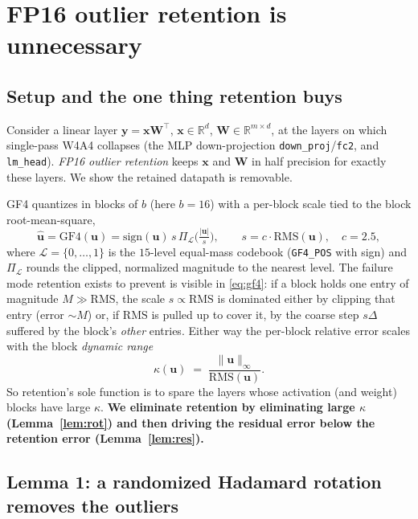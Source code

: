 \documentclass[11pt]{article}
\theoremstyle{remark}
\newcommand{\R}{\mathbb{R}}
\newcommand{\norm}[1]{\lVert #1 \rVert}
\newcommand{\rms}{\mathrm{RMS}}
\newcommand{\gf}{\mathrm{GF4}}
\begin{document}
\section{FP16 outlier retention is unnecessary}
\label{sec:retention}

\subsection{Setup and the one thing retention buys}

Consider a linear layer $\bm y = \bm x \bm W^{\!\top}$, $\bm x\in\R^{d}$,
$\bm W\in\R^{m\times d}$, at the layers on which single-pass W4A4 collapses
(the MLP down-projection \texttt{down\_proj}/\texttt{fc2}, and
\texttt{lm\_head}). \emph{FP16 outlier retention} keeps $\bm x$ and $\bm W$ in
half precision for exactly these layers. We show the retained datapath is
removable.

GF4 quantizes in blocks of $b$ (here $b{=}16$) with a per-block scale tied to
the block root-mean-square,
\begin{equation}
\label{eq:gf4}
\hat{\bm u} = \gf(\bm u)
       = \mathrm{sign}(\bm u)\,s\,
         \Pi_{\mathcal L}\!\Big(\tfrac{|\bm u|}{s}\Big),
\qquad
s = c\cdot\rms(\bm u),\quad c = 2.5,
\end{equation}
where $\mathcal L=\{0,\dots,1\}$ is the $15$-level equal-mass codebook
(\texttt{GF4\_POS} with sign) and $\Pi_{\mathcal L}$ rounds the clipped,
normalized magnitude to the nearest level. The failure mode retention exists to
prevent is visible in \eqref{eq:gf4}: if a block holds one entry of magnitude
$M\gg\rms$, the scale $s\propto\rms$ is dominated either by clipping that entry
(error $\sim M$) or, if $\rms$ is pulled up to cover it, by the coarse step
$s\Delta$ suffered by the block's \emph{other} entries. Either way the per-block
relative error scales with the block \emph{dynamic range}
\begin{equation}
\label{eq:kappa}
\kappa(\bm u)\;=\;\frac{\norm{\bm u}_\infty}{\rms(\bm u)} .
\end{equation}
So retention's sole function is to spare the layers whose activation (and
weight) blocks have large $\kappa$. \textbf{We eliminate retention by
eliminating large $\kappa$ (Lemma~\ref{lem:rot}) and then driving the residual
error below the retention error (Lemma~\ref{lem:res}).}

\subsection{Lemma 1: a randomized Hadamard rotation removes the outliers}
\end{document}
